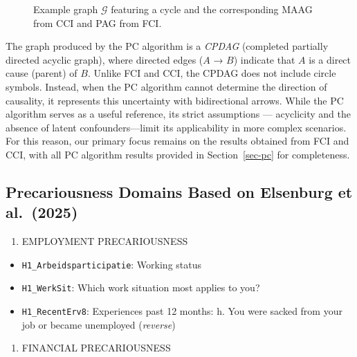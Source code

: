 \documentclass[
]{article}
\providecommand{\tightlist}{%
  \setlength{\itemsep}{0pt}\setlength{\parskip}{0pt}}\usepackage{longtable,booktabs,array}
\begin{document}
\begin{figure}
\begin{minipage}{0.33\linewidth}
{}


\end{minipage}%

\caption{\label{fig-examplegraphs}Example graph \(\mathcal{G}\)
featuring a cycle and the corresponding MAAG from CCI and PAG from FCI.}

\end{figure}%

The graph produced by the PC algorithm is a \emph{CPDAG} (completed
partially directed acyclic graph), where directed edges (\(A\) → \(B\))
indicate that \(A\) is a direct cause (parent) of \(B\). Unlike FCI and
CCI, the CPDAG does not include circle symbols. Instead, when the PC
algorithm cannot determine the direction of causality, it represents
this uncertainty with bidirectional arrows. While the PC algorithm
serves as a useful reference, its strict assumptions --- acyclicity and
the absence of latent confounders---limit its applicability in more
complex scenarios. For this reason, our primary focus remains on the
results obtained from FCI and CCI, with all PC algorithm results
provided in Section~\ref{sec-pc} for completeness.

\subsection{Precariousness Domains Based on Elsenburg et
al.~(2025)}\label{precariousness-domains-based-on-elsenburg-et-al.-2025}

\begin{enumerate}
\def\labelenumi{\arabic{enumi}.}
\tightlist
\item
  EMPLOYMENT PRECARIOUSNESS
\end{enumerate}

\begin{itemize}
\tightlist
\item
  \texttt{H1\_Arbeidsparticipatie}: Working status
\item
  \texttt{H1\_WerkSit}: Which work situation most applies to you?
\item
  \texttt{H1\_RecentErv8}: Experiences past 12 months: h. You were
  sacked from your job or became unemployed (\emph{reverse})
\end{itemize}

\begin{enumerate}
\def\labelenumi{\arabic{enumi}.}
\setcounter{enumi}{1}
\tightlist
\item
  FINANCIAL PRECARIOUSNESS
\end{enumerate}
\end{document}
